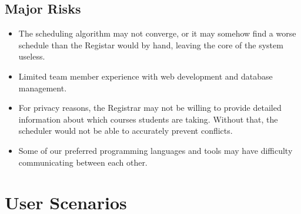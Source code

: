 \documentclass[11pt]{article}
\begin{document}
\subsection{Major Risks} %

\begin{itemize}
\item The scheduling algorithm may not converge, or it may somehow find a worse schedule than the Registar would by hand, leaving the core of the system useless.
\item Limited team member experience with web development and database management.
\item For privacy reasons, the Registrar may not be willing to provide detailed information about which courses students are taking. Without that, the scheduler would not be able to accurately prevent conflicts.
\item Some of our preferred programming languages and tools may have difficulty communicating between each other. %
\end{itemize}


\section{User Scenarios}  %
\end{document}

